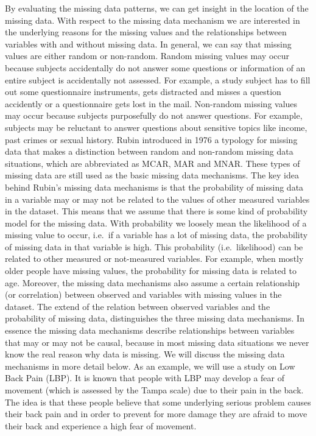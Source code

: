 \documentclass[]{book}
\theoremstyle{definition}
\theoremstyle{definition}
\theoremstyle{definition}
\theoremstyle{remark}
\begin{document}
By evaluating the missing data patterns, we can get insight in the
location of the missing data. With respect to the missing data mechanism
we are interested in the underlying reasons for the missing values and
the relationships between variables with and without missing data. In
general, we can say that missing values are either random or non-random.
Random missing values may occur because subjects accidentally do not
answer some questions or information of an entire subject is
accidentally not assessed. For example, a study subject has to fill out
some questionnaire instruments, gets distracted and misses a question
accidently or a questionnaire gets lost in the mail. Non-random missing
values may occur because subjects purposefully do not answer questions.
For example, subjects may be reluctant to answer questions about
sensitive topics like income, past crimes or sexual history. Rubin
introduced in 1976 a typology for missing data that makes a distinction
between random and non-random missing data situations, which are
abbreviated as MCAR, MAR and MNAR. These types of missing data are still
used as the basic missing data mechanisms. The key idea behind Rubin's
missing data mechanisms is that the probability of missing data in a
variable may or may not be related to the values of other measured
variables in the dataset. This means that we assume that there is some
kind of probability model for the missing data. With probability we
loosely mean the likelihood of a missing value to occur, i.e.~if a
variable has a lot of missing data, the probability of missing data in
that variable is high. This probability (i.e.~likelihood) can be related
to other measured or not-measured variables. For example, when mostly
older people have missing values, the probability for missing data is
related to age. Moreover, the missing data mechanisms also assume a
certain relationship (or correlation) between observed and variables
with missing values in the dataset. The extend of the relation between
observed variables and the probability of missing data, distinguishes
the three missing data mechanisms. In essence the missing data
mechanisms describe relationships between variables that may or may not
be causal, because in most missing data situations we never know the
real reason why data is missing. We will discuss the missing data
mechanisms in more detail below. As an example, we will use a study on
Low Back Pain (LBP). It is known that people with LBP may develop a fear
of movement (which is assessed by the Tampa scale) due to their pain in
the back. The idea is that these people believe that some underlying
serious problem causes their back pain and in order to prevent for more
damage they are afraid to move their back and experience a high fear of
movement.
\end{document}
